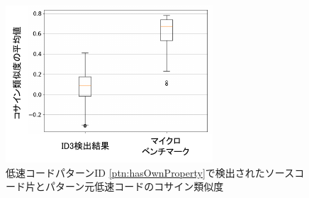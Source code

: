 \documentclass[submit,techrep,noauthor]{ipsj}
\begin{document}


\begin{figure}[t]
    \centering
    \includegraphics[width=1.0\linewidth]{./Noguchi_fig/boxplot_compare.pdf}
    \caption{低速コードパターンID \ref{ptn:hasOwnProperty}で検出されたソースコード片とパターン元低速コードのコサイン類似度}
    \label{fig:boxplot_cosine}
\end{figure}
\end{document}
